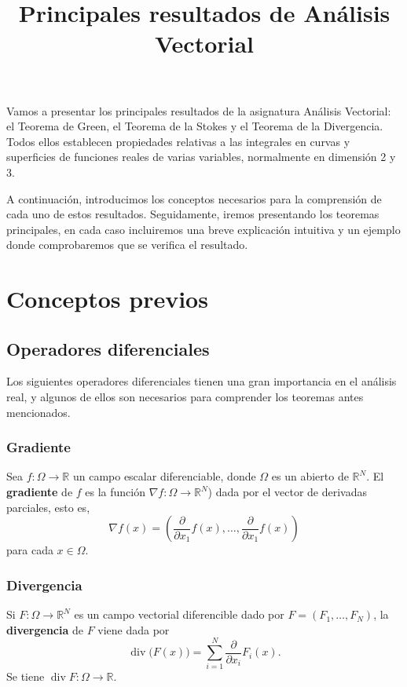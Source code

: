 \documentclass[12pt,spanish]{article}
\title{Principales resultados de Análisis Vectorial}
\date{}
\theoremstyle{definition}
\theoremstyle{remark}
\begin{document}
\maketitle

Vamos a presentar los principales resultados de la asignatura Análisis Vectorial: el Teorema de Green, el Teorema de la Stokes y el Teorema de la Divergencia. Todos ellos establecen propiedades relativas a las integrales en curvas y superficies de funciones reales de varias variables, normalmente en dimensión 2 y 3.

A continuación, introducimos los conceptos necesarios para la comprensión de cada uno de estos resultados. Seguidamente, iremos presentando los teoremas principales, en cada caso incluiremos una breve explicación intuitiva y un ejemplo donde comprobaremos que se verifica el resultado.

\section{Conceptos previos}

\subsection{Operadores diferenciales}

Los siguientes operadores diferenciales tienen una gran importancia en el análisis real, y algunos de ellos son necesarios para comprender los teoremas antes mencionados.

\subsubsection*{Gradiente}

Sea $f:\Omega\rightarrow\mathbb{R}$ un campo escalar diferenciable, donde $\Omega$ es un abierto de $\mathbb{R}^N$. El \textbf{gradiente} de $f$ es la función $\nabla f: \Omega\rightarrow\mathbb{R}^N$) dada por el vector de derivadas parciales, esto es,
\[\nabla f(x)=\left(\frac{\partial}{\partial x_1}f(x),\ldots,\frac{\partial}{\partial x_1}f(x)\right)\]
para cada $x\in \Omega$.

\subsubsection*{Divergencia}

Si $F:\Omega\rightarrow\mathbb{R}^N$ es un campo vectorial diferencible dado por $F=(F_1,\ldots, F_N)$, la \textbf{divergencia} de $F$ viene dada por
\[\operatorname{div}\big(F(x)\big)=\sum_{i=1}^N\frac{\partial}{\partial x_i}F_i(x).\]
Se tiene $\operatorname{div} F:\Omega\rightarrow\mathbb{R}$.
\end{document}
